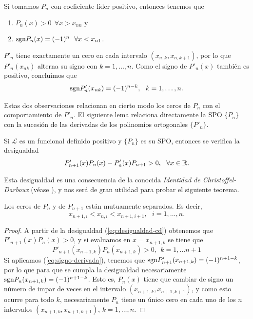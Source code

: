 \begin{observacion}
    Si tomamos $P_n$ con coeficiente líder positivo, entonces tenemos que 
    \begin{enumerate}
        \item $P_n(x) > 0 \ \ \forall x>x_{nn}$ y 
        \item $\mathrm{sgn} P_n(x) = (-1)^{n}  \ \ \forall x<x_{n1}$.
    \end{enumerate}
\end{observacion}

\begin{observacion}
    $P'_n$ tiene exactamente un cero en cada intervalo $(x_{n,k},x_{n,k+1})$, por lo que $P'_n(x_{nk})$ alterna su signo con $k=1,\dots ,n$. Como el signo de $P'_n(x)$ también es positivo, concluimos que
    \begin{equation}
        \label{eq:signo-derivada}
        \mathrm{sgn} P'_n(x_{nk}) =(-1)^{n-k}, \ \ k = 1,\dots, n.
    \end{equation}
    

\end{observacion}

Estas dos observaciones relacionan en cierto modo los ceros de $P_n$ con el comportamiento de $P'_n$. El siguiente lema relaciona directamente la SPO $\{P_n\}$ con la sucesión de las derivadas de los polinomios ortogonales $\{P'_n\}$. 

\begin{lema}
    Si $\mathcal{L}$ es un funcional definido positivo y $\{P_n\}$ es su SPO, entonces se verifica la desigualdad
    \begin{equation}
        \label{eq:desigualdad-cd}
        P'_{n+1}(x)P_n(x) -P'_n(x)P_{n+1} > 0, \ \ \forall x\in\mathbb{R}.
    \end{equation}
\end{lema}

Esta desigualdad es una consecuencia de la conocida \textit{Identidad de Christoffel-Darboux} (véase \cite[Theorem 4.5]{chihara}), y nos será de gran utilidad para probar el siguiente teorema.

\begin{teorema}
    Los ceros de $P_n$ y de $P_{n+1}$ están mutuamente separados. Es decir,
    $$
    x_{n+1,i} < x_{n,i} < x_{n+1,i+1}, \ \ \ i=1,\dots, n.
    $$
\end{teorema}
\begin{proof}
    A partir de la desigualdad (\ref{eq:desigualdad-cd}) obtenemos que $P'_{n+1}(x)P_n(x)>0$, y si evaluamos en $x=x_{n+1,k}$ se tiene que
    $$
    P'_{n+1}(x_{n+1,k})P_n(x_{n+1,k})>0, \ \ k=1,\dots n+1
    $$
    Si aplicamos (\ref{eq:signo-derivada}), tenemos que $\mathrm{sgn}  P'_{n+1}(x_{n+1,k}) = (-1)^{n+1-k}$, por lo que para que se cumpla la desigualdad necesariamente $\mathrm{sgn} P_n(x_{n+1,k}) = (-1)^{n+1-k}$.
    Esto es, $P_n(x)$ tiene que cambiar de signo un número de impar de veces en el intervalo $(x_{n+1,k},x_{n+1,k+1})$, y como esto ocurre para todo $k$, necesariamente $P_n$ tiene un único cero en cada uno de los $n$ intervalos $(x_{n+1,k},x_{n+1,k+1})$, $k=1,\dots, n$.
\end{proof}

